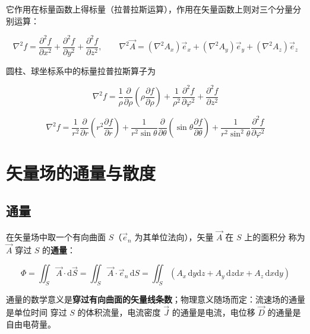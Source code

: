 它作用在标量函数上得标量（拉普拉斯运算），作用在矢量函数上则对三个分量分别运算：
\begin{formulaBox}
\[
\nabla^2 f=\frac{\partial^2 f}{\partial x^2}+\frac{\partial^2 f}{\partial y^2}+\frac{\partial^2 f}{\partial z^2},
\qquad
\nabla^2\vec{A}=(\nabla^2A_x)\vec{e}_x+(\nabla^2A_y)\vec{e}_y+(\nabla^2A_z)\vec{e}_z
\]
\end{formulaBox}

圆柱、球坐标系中的标量拉普拉斯算子为
\begin{formulaBox}
\[
\nabla^2 f=\frac{1}{\rho}\frac{\partial}{\partial\rho}\left(\rho\frac{\partial f}{\partial\rho}\right)
+\frac{1}{\rho^2}\frac{\partial^2 f}{\partial\varphi^2}+\frac{\partial^2 f}{\partial z^2}
\]
\end{formulaBox}
\begin{formulaBox}
\[
\nabla^2 f=\frac{1}{r^2}\frac{\partial}{\partial r}\left(r^2\frac{\partial f}{\partial r}\right)
+\frac{1}{r^2\sin\theta}\frac{\partial}{\partial\theta}\left(\sin\theta\frac{\partial f}{\partial\theta}\right)
+\frac{1}{r^2\sin^2\theta}\frac{\partial^2 f}{\partial\varphi^2}
\]
\end{formulaBox}


\section{矢量场的通量与散度}

\subsection{通量}

在矢量场中取一个有向曲面 $S$（$\vec{e}_n$ 为其单位法向），矢量 $\vec{A}$ 在 $S$ 上的面积分
称为 $\vec{A}$ 穿过 $S$ 的\textbf{通量}：
\begin{formulaBox}
\[
\Phi=\iint_S\vec{A}\cdot\mathrm{d}\vec{S}=\iint_S\vec{A}\cdot\vec{e}_n\,\mathrm{d}S
=\iint_S\left(A_x\,\mathrm{d}y\mathrm{d}z+A_y\,\mathrm{d}z\mathrm{d}x+A_z\,\mathrm{d}x\mathrm{d}y\right)
\]
\end{formulaBox}

通量的数学意义是\textbf{穿过有向曲面的矢量线条数}；物理意义随场而定：流速场的通量是单位时间
穿过 $S$ 的体积流量，电流密度 $\vec{J}$ 的通量是电流，电位移 $\vec{D}$ 的通量是自由电荷量。


